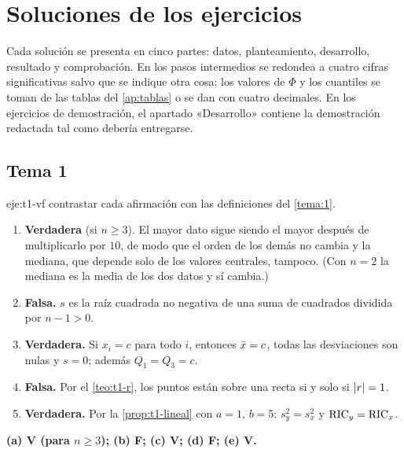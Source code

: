 \chapter{Soluciones de los ejercicios}
\label{ap:soluciones}

Cada solución se presenta en cinco partes: datos, planteamiento, desarrollo, resultado y comprobación. En los pasos intermedios se redondea a cuatro cifras significativas salvo que se indique otra cosa; los valores de $\Phi$ y los cuantiles se toman de las tablas del \cref{ap:tablas} o se dan con cuatro decimales. En los ejercicios de demostración, el apartado «Desarrollo» contiene la demostración redactada tal como debería entregarse.

\section{Tema 1}

\begin{solucion}{eje:t1-vf}
\planteamiento contrastar cada afirmación con las definiciones del \cref{tema:1}.
\pasos
\begin{enumerate}[label=(\alph*)]
  \item \textbf{Verdadera} (si $n\ge 3$). El mayor dato sigue siendo el mayor después de multiplicarlo por $10$, de modo que el orden de los demás no cambia y la mediana, que depende solo de los valores centrales, tampoco. (Con $n=2$ la mediana es la media de los dos datos y sí cambia.)
  \item \textbf{Falsa.} $s$ es la raíz cuadrada no negativa de una suma de cuadrados dividida por $n-1>0$.
  \item \textbf{Verdadera.} Si $x_i=c$ para todo $i$, entonces $\bar{x}=c$, todas las desviaciones son nulas y $s=0$; además $Q_1=Q_3=c$.
  \item \textbf{Falsa.} Por el \cref{teo:t1-r}, los puntos están sobre una recta si y solo si $\lvert r\rvert=1$.
  \item \textbf{Verdadera.} Por la \cref{prop:t1-lineal} con $a=1$, $b=5$: $s_y^{2}=s_x^{2}$ y $\operatorname{RIC}_y=\operatorname{RIC}_x$.
\end{enumerate}
\resultado \textbf{(a) V (para $n\ge3$); (b) F; (c) V; (d) F; (e) V.}
\end{solucion}

